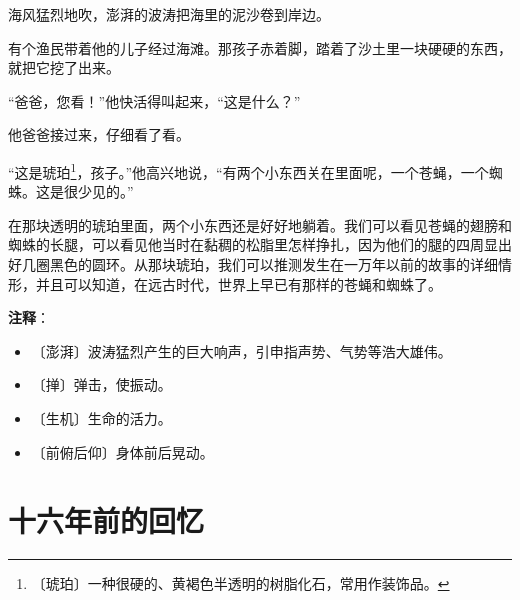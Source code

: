 \documentclass[12pt,UTF-8,openany]{ctexbook}
\begin{document}
\begin{Large}
    海风猛烈地吹，澎湃的波涛把海里的泥沙卷到岸边。
    
    有个渔民带着他的儿子经过海滩。那孩子赤着脚，踏着了沙土里一块硬硬的东西，就把它挖了出来。
    
    “爸爸，您看！”他快活得叫起来，“这是什么？”
    
    他爸爸接过来，仔细看了看。
    
    “这是琥珀\footnote{〔琥珀〕一种很硬的、黄褐色半透明的树脂化石，常用作装饰品。}，孩子。”他高兴地说，“有两个小东西关在里面呢，一个苍蝇，一个蜘蛛。这是很少见的。”
    
    在那块透明的琥珀里面，两个小东西还是好好地躺着。我们可以看见苍蝇的翅膀和蜘蛛的长腿，可以看见他当时在黏稠的松脂里怎样挣扎，因为他们的腿的四周显出好几圈黑色的圆环。从那块琥珀，我们可以推测发生在一万年以前的故事的详细情形，并且可以知道，在远古时代，世界上早已有那样的苍蝇和蜘蛛了。
    
\end{Large}


\newpage

\textbf{注释}：

\vspace{-1em}

\begin{itemize}
    \setlength\itemsep{-0.2em}
    \item 〔澎湃〕波涛猛烈产生的巨大响声，引申指声势、气势等浩大雄伟。
    \item 〔掸〕弹击，使振动。
    \item 〔生机〕生命的活力。
    \item 〔前俯后仰〕身体前后晃动。
\end{itemize}

\chapter{十六年前的回忆}
\end{document}
